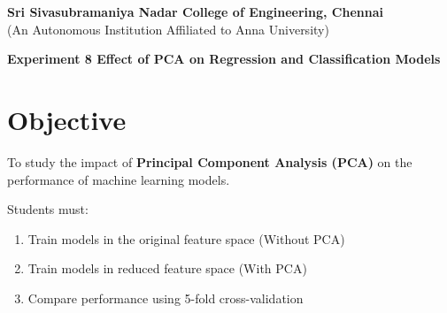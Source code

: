 \documentclass[11pt]{article}
\begin{document}
\begin{center}
    \large \textbf{Sri Sivasubramaniya Nadar College of Engineering, Chennai} \\
    (An Autonomous Institution Affiliated to Anna University) \\
    \vspace{0.3cm}
\end{center}
\begin{table}[h]
\renewcommand{\arraystretch}{1.4}
\end{table}

\begin{center}
    \textbf{\Large Experiment 8 Effect of PCA on Regression and Classification Models}
\end{center}



\section*{Objective}

To study the impact of \textbf{Principal Component Analysis (PCA)} 
on the performance of machine learning models.

Students must:

\begin{enumerate}[label=\alph*)]
    \item Train models in the original feature space (Without PCA)
    \item Train models in reduced feature space (With PCA)
    \item Compare performance using 5-fold cross-validation
\end{enumerate}

\end{document}
